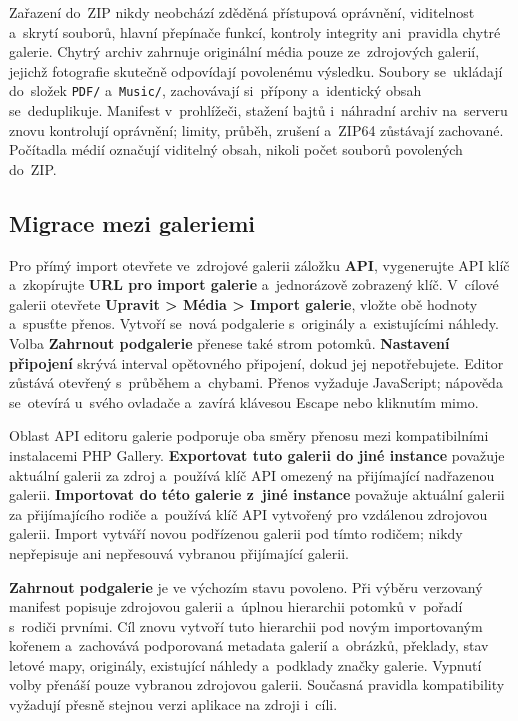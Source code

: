 \documentclass[11pt,a4paper]{article}
\newcommand{\ui}[1]{\textbf{#1}}
\begin{document}
Zařazení do~ZIP nikdy neobchází zděděná přístupová oprávnění, viditelnost
a~skrytí souborů, hlavní přepínače funkcí, kontroly integrity ani~pravidla
chytré galerie. Chytrý archiv zahrnuje originální média pouze ze~zdrojových
galerií, jejichž fotografie skutečně odpovídají povolenému výsledku. Soubory
se~ukládají do~složek \texttt{PDF/} a~\texttt{Music/}, zachovávají si~přípony
a~identický obsah se~deduplikuje. Manifest v~prohlížeči, stažení bajtů
i~náhradní archiv na~serveru znovu kontrolují oprávnění; limity, průběh, zrušení
a~ZIP64 zůstávají zachované. Počítadla médií označují viditelný obsah, nikoli
počet souborů povolených do~ZIP.

\subsection{Migrace mezi galeriemi}

Pro přímý import otevřete ve~zdrojové galerii záložku \ui{API},
vygenerujte API klíč a~zkopírujte \ui{URL pro import galerie}
a~jednorázově zobrazený klíč. V~cílové galerii otevřete
\ui{Upravit > Média > Import galerie}, vložte obě hodnoty a~spusťte
přenos. Vytvoří se~nová podgalerie s~originály a~existujícími náhledy.
Volba \ui{Zahrnout podgalerie} přenese také strom potomků.
\ui{Nastavení připojení} skrývá interval opětovného připojení,
dokud jej nepotřebujete. Editor zůstává otevřený s~průběhem a~chybami.
Přenos vyžaduje JavaScript; nápověda se~otevírá u~svého ovladače
a~zavírá klávesou Escape nebo kliknutím mimo.

Oblast API editoru galerie podporuje oba směry přenosu mezi kompatibilními
instalacemi PHP Gallery. \ui{Exportovat tuto galerii do jiné instance} považuje
aktuální galerii za zdroj a~používá klíč API omezený na přijímající nadřazenou
galerii. \ui{Importovat do této galerie z~jiné instance} považuje aktuální
galerii za přijímajícího rodiče a~používá klíč API vytvořený pro vzdálenou
zdrojovou galerii. Import vytváří novou podřízenou galerii pod tímto rodičem;
nikdy nepřepisuje ani nepřesouvá vybranou přijímající galerii.

\ui{Zahrnout podgalerie} je ve výchozím stavu povoleno. Při výběru verzovaný
manifest popisuje zdrojovou galerii a~úplnou hierarchii potomků v~pořadí
s~rodiči prvními. Cíl znovu vytvoří tuto hierarchii pod novým importovaným
kořenem a~zachovává podporovaná metadata galerií a~obrázků, překlady, stav
letové mapy, originály, existující náhledy a~podklady značky galerie. Vypnutí
volby přenáší pouze vybranou zdrojovou galerii. Současná pravidla kompatibility
vyžadují přesně stejnou verzi aplikace na zdroji i~cíli.
\end{document}
